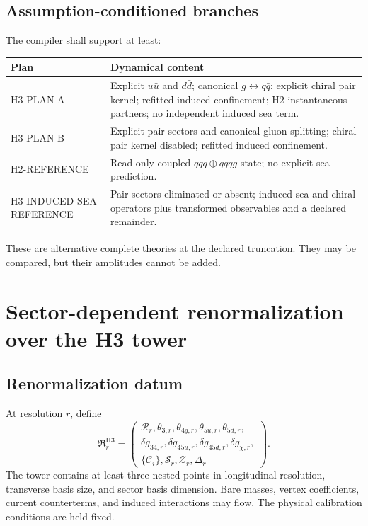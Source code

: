 \documentclass[11pt]{article}
\newcommand{\cR}{\mathcal R}
\newcommand{\cS}{\mathcal S}
\newcommand{\cC}{\mathcal C}
\newcommand{\cZ}{\mathcal Z}
\begin{document}
\subsection{Assumption-conditioned branches}

The compiler shall support at least:
\begin{longtable}{L{0.19\textwidth}L{0.73\textwidth}}
\toprule
Plan & Dynamical content\\
\midrule
\endhead
H3-PLAN-A & Explicit \(u\bar u\) and \(d\bar d\); canonical
\(g\leftrightarrow q\bar q\); explicit chiral pair kernel; refitted induced
confinement; H2 instantaneous partners; no independent induced sea term.\\
H3-PLAN-B & Explicit pair sectors and canonical gluon splitting; chiral pair
kernel disabled; refitted induced confinement.\\
H2-REFERENCE & Read-only coupled \(qqq\oplus qqqg\) state; no explicit sea
prediction.\\
H3-INDUCED-SEA-REFERENCE & Pair sectors eliminated or absent; induced sea and
chiral operators plus transformed observables and a declared remainder.\\
\bottomrule
\end{longtable}
These are alternative complete theories at the declared truncation.  They may
be compared, but their amplitudes cannot be added.

\section{Sector-dependent renormalization over the H3 tower}
\label{sec:renormalization}

\subsection{Renormalization datum}

At resolution \(r\), define
\begin{equation}
 \mathfrak R_r^{\mathrm{H3}}
 =
 \left(
 \begin{array}{c}
 \cR_r,
 \theta_{3,r},\theta_{4g,r},\theta_{5u,r},\theta_{5d,r},\\
 \delta g_{34,r},\delta g_{45u,r},\delta g_{45d,r},
 \delta g_{\chi,r},\\
 \{\cC_i\},\cS_r,\cZ_r,\Delta_r
 \end{array}
 \right).
 \label{eq:h3-ren-data}
\end{equation}
The tower contains at least three nested points in longitudinal resolution,
transverse basis size, and sector basis dimension.  Bare masses, vertex
coefficients, current counterterms, and induced interactions may flow.  The
physical calibration conditions are held fixed.
\end{document}
